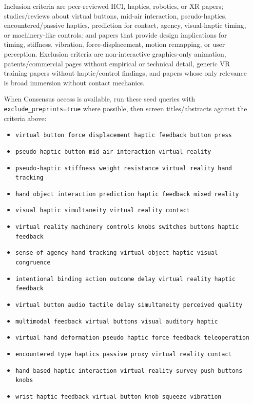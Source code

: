 \documentclass[11pt]{article}
\begin{document}
Inclusion criteria are peer-reviewed HCI, haptics, robotics, or XR papers; studies/reviews about virtual buttons, mid-air interaction, pseudo-haptics, encountered/passive haptics, prediction for contact, agency, visual-haptic timing, or machinery-like controls; and papers that provide design implications for timing, stiffness, vibration, force-displacement, motion remapping, or user perception. Exclusion criteria are non-interactive graphics-only animation, patents/commercial pages without empirical or technical detail, generic VR training papers without haptic/control findings, and papers whose only relevance is broad immersion without contact mechanics.

When Consensus access is available, run these seed queries with \texttt{exclude\_preprints=true} where possible, then screen titles/abstracts against the criteria above:
\begin{itemize}
  \item \texttt{virtual button force displacement haptic feedback button press}
  \item \texttt{pseudo-haptic button mid-air interaction virtual reality}
  \item \texttt{pseudo-haptic stiffness weight resistance virtual reality hand tracking}
  \item \texttt{hand object interaction prediction haptic feedback mixed reality}
  \item \texttt{visual haptic simultaneity virtual reality contact}
  \item \texttt{virtual reality machinery controls knobs switches buttons haptic feedback}
  \item \texttt{sense of agency hand tracking virtual object haptic visual congruence}
  \item \texttt{intentional binding action outcome delay virtual reality haptic feedback}
  \item \texttt{virtual button audio tactile delay simultaneity perceived quality}
  \item \texttt{multimodal feedback virtual buttons visual auditory haptic}
  \item \texttt{virtual hand deformation pseudo haptic force feedback teleoperation}
  \item \texttt{encountered type haptics passive proxy virtual reality contact}
  \item \texttt{hand based haptic interaction virtual reality survey push buttons knobs}
  \item \texttt{wrist haptic feedback virtual button knob squeeze vibration}
\end{itemize}
\end{document}
